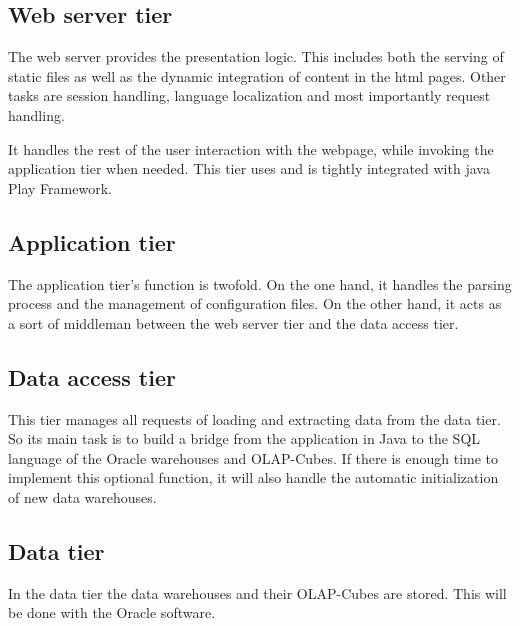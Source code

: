  

\subsection{Web server tier}
The web server provides the presentation logic. This includes both the serving of static files as well as
the dynamic integration of content in the html pages.
Other tasks are session handling, language localization and most importantly request handling.

It handles the rest of the user interaction with the webpage, while invoking the application tier when needed.
This tier uses and is tightly integrated with java Play Framework.


\subsection{Application tier}
The application tier's function is twofold.
On the one hand, it handles the parsing process and the management of configuration files.
On the other hand, it acts as a sort of middleman between the web server tier and the data access tier.

\subsection{Data access tier}
This tier manages all requests of loading and extracting data from the data tier. So its main task is
to build a bridge from the application in Java to the SQL language of the Oracle warehouses and OLAP-Cubes.
If there is enough time to implement this optional function, it will also handle 
the automatic initialization of new data warehouses.  

\subsection{Data tier}
In the data tier the data warehouses and their OLAP-Cubes are stored. 
This will be done with the Oracle software.  
